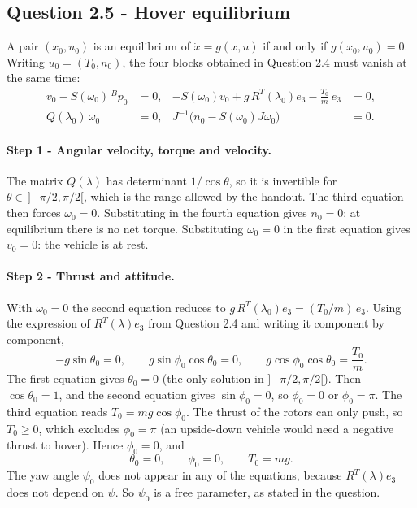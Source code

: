 \subsection*{Question 2.5 - Hover equilibrium}

A pair $(x_0, u_0)$ is an equilibrium of $\dot x = g(x, u)$ if and only if $g(x_0, u_0) = 0$.
Writing $u_0 = (T_0, n_0)$, the four blocks obtained in Question 2.4 must vanish at the same time:
\begin{align*}
v_0 - S(\omega_0)\, {}^B p_0 &= 0, &
-S(\omega_0) v_0 + g\, R^T(\lambda_0) e_3 - \tfrac{T_0}{m}\, e_3 &= 0, \\
Q(\lambda_0)\, \omega_0 &= 0, &
J^{-1}\big(n_0 - S(\omega_0) J \omega_0\big) &= 0 .
\end{align*}

\paragraph{Step 1 - Angular velocity, torque and velocity.}
The matrix $Q(\lambda)$ has determinant $1/\cos\theta$, so it is invertible for $\theta \in\, ]{-\pi/2}, \pi/2[$, which is the range allowed by the handout.
The third equation then forces $\omega_0 = 0$.
Substituting in the fourth equation gives $n_0 = 0$: at equilibrium there is no net torque.
Substituting $\omega_0 = 0$ in the first equation gives $v_0 = 0$: the vehicle is at rest.

\paragraph{Step 2 - Thrust and attitude.}
With $\omega_0 = 0$ the second equation reduces to $g\, R^T(\lambda_0) e_3 = (T_0/m)\, e_3$.
Using the expression of $R^T(\lambda) e_3$ from Question 2.4 and writing it component by component,
\begin{equation*}
-g \sin\theta_0 = 0, \qquad
g \sin\phi_0 \cos\theta_0 = 0, \qquad
g \cos\phi_0 \cos\theta_0 = \frac{T_0}{m}.
\end{equation*}
The first equation gives $\theta_0 = 0$ (the only solution in $]{-\pi/2}, \pi/2[$).
Then $\cos\theta_0 = 1$, and the second equation gives $\sin\phi_0 = 0$, so $\phi_0 = 0$ or $\phi_0 = \pi$.
The third equation reads $T_0 = m g \cos\phi_0$.
The thrust of the rotors can only push, so $T_0 \geq 0$, which excludes $\phi_0 = \pi$ (an upside-down vehicle would need a negative thrust to hover).
Hence $\phi_0 = 0$, and
\begin{equation*}
\theta_0 = 0, \qquad \phi_0 = 0, \qquad T_0 = m g .
\end{equation*}
The yaw angle $\psi_0$ does not appear in any of the equations, because $R^T(\lambda) e_3$ does not depend on $\psi$.
So $\psi_0$ is a free parameter, as stated in the question.


